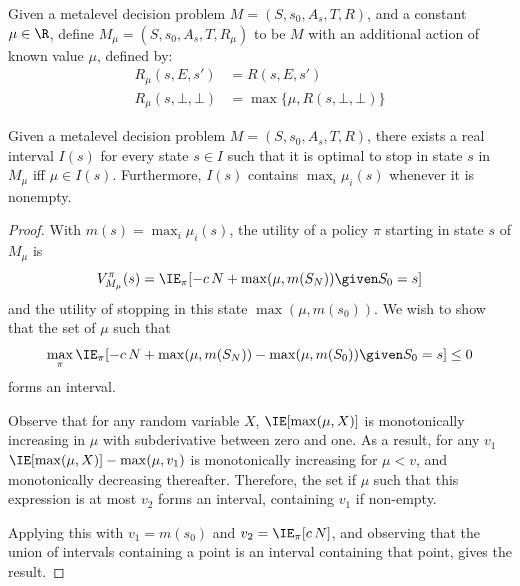 
\begin{dfn}\label{dfn:context}
	Given a metalevel decision problem $M=(S,s_0,A_s,T,R)$, and a constant $\mu\in\R$,
	define $M_\mu = (S,s_0,A_s,T,R_\mu)$ to be $M$ with an additional action of known 
	value $\mu$, defined by:
	\begin{align*}
		R_\mu(s,E,s')      &= R(s,E,s') \\
		R_\mu(s,\bot,\bot) &= \max\{\mu, R(s,\bot,\bot)\}
	\end{align*}
\end{dfn}

\begin{thm}
	Given a metalevel decision problem $M=(S,s_0,A_s,T,R)$, 
	there exists a real interval $I(s)$ for every state $s\in I$ such that
	it is optimal to stop in state $s$ in $M_\mu$ iff $\mu\in I(s)$.
	Furthermore, $I(s)$ contains $\max_i\mu_i(s)$ whenever it is nonempty.
\end{thm}

\begin{proof}

With $m(s) = \max_i\mu_i(s)$, the utility of a policy $\pi$ starting in state $s$ of $M_\mu$ is
\[
	V^\pi_{M_\mu}(s) = \IE_{\pi}[-c\,N + \max(\mu,m(S_N)) \given S_0=s]
\]
and the utility of stopping in this state $\max(\mu,m(s_0))$.
We wish to show that the set of $\mu$ such that
\[
	\max_\pi \IE_{\pi}[-c\,N + \max(\mu,m(S_N)) - \max(\mu,m(S_0)) \given S_0=s] \le 0
\]
forms an interval.  

Observe that for any random variable $X$, 
	$\IE[\max(\mu,X)]$ is monotonically increasing in $\mu$ with subderivative between zero and one.
As a result, for any $v_1$
	$\IE[\max(\mu,X)] - \max(\mu,v_1)$ 
	is monotonically increasing for $\mu<v$, 
	and monotonically decreasing thereafter.
Therefore, the set if $\mu$ such that this expression is at most $v_2$ forms an interval, containing $v_1$ if non-empty.

Applying this with $v_1 = m(s_0)$ and $v_2=\IE_{\pi}[c\,N]$, and observing that the union of intervals containing
a point is an interval containing that point, gives the result.
\end{proof}

